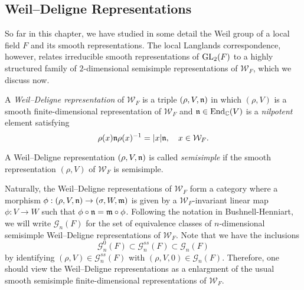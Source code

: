 \subsection{Weil--Deligne Representations}\label{sec:weildeligne}
So far in this chapter, we have studied in some detail the Weil group of a local field $F$ and its smooth representations. The local Langlands correspondence, however, relates irreducible smooth representations of $\mathrm{GL}_2(F)$ to a highly structured family of $2$-dimensional semisimple representations of $\mathcal{W}_F$, which we discuss now.

\begin{defn}\label{defn:WeilDeligne}
    A \textit{Weil--Deligne representation} of $\mathcal{W}_F$ is a triple $(\rho,V,\mathfrak{n})$ in which $(\rho,V)$ is a smooth finite-dimensional representation of $\mathcal{W}_F$ and $\mathfrak{n}\in\mathrm{End}_{\mathbb{C}}(V)$ is a \textit{nilpotent} element satisfying
    $$\rho(x)\mathfrak{n}\rho(x)^{-1}=|x|\mathfrak{n},\quad x\in \mathcal{W}_F.$$

    A Weil--Deligne representation $(\rho,V,\mathfrak{n})$ is called \textit{semisimple} if the smooth representation $(\rho,V)$ of $\mathcal{W}_F$ is semisimple.
\end{defn}

Naturally, the Weil--Deligne representations of $\mathcal{W}_F$ form a category where a morphism $\phi:(\rho,V,\mathfrak{n})\to(\sigma,W,\mathfrak{m})$ is given by a $\mathcal{W}_F$-invariant linear map $\phi:V\to W$ such that $\phi\circ\mathfrak{n}=\mathfrak{m}\circ\phi$. Following the notation in Bushnell-Henniart, we will write $\mathcal{G}_n(F)$ for the set of equivalence classes of $n$-dimensional semisimple Weil--Deligne representations of $\mathcal{W}_F$. Note that we have the inclusions
$$\mathcal{G}^{0}_n(F)\subset\mathcal{G}_n^{ss}(F)\subset\mathcal{G}_n(F)$$
by identifying $(\rho,V)\in\mathcal{G}_n^{ss}(F)$ with $(\rho,V,0)\in\mathcal{G}_n(F)$. Therefore, one should view the Weil--Deligne representations as a enlargment of the usual smooth semisimple finite-dimensional representations of $\mathcal{W}_F$. 

